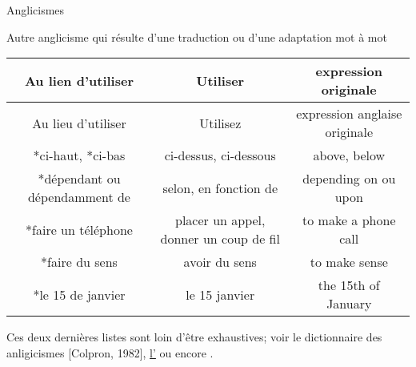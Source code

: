 \documentclass[french]{beamer}
\newcommand\red[1]{{\color{ulred}{\textbf{#1}}}}
\begin{document}
\begin{frame}{Anglicismes}

Autre anglicisme qui résulte d'une traduction ou d'une adaptation mot à mot
\begin{center}\tiny
	\begin{tabular}{ccc}
		\hline
		Au lien d'utiliser & Utiliser & expression originale \\
		\hline
		 Au lieu d'utiliser & Utilisez & expression anglaise originale \\ 
		*ci-haut, *ci-bas & ci-dessus, ci-dessous & above, below \\ 
		*dépendant ou dépendamment de & selon, en fonction de & depending on ou upon \\ 
		*faire un téléphone & placer un appel, donner un coup de fil & to make a phone call \\ 
		*faire du sens & avoir du sens & to make sense \\ 
		*le 15 de janvier & le 15 janvier & the 15th of January \\ 
		\hline
	\end{tabular} 
\end{center}

\vfill
\scriptsize{
Ces deux dernières listes sont loin d'être exhaustives; voir le dictionnaire des anligicismes [Colpron, 1982], \href{http://bdl.oqlf.gouv.qc.ca/bdl/gabarit_bdl.asp?T1=anglicisme&T3.x=0&T3.y=0}{l'\red{OQLF}} ou encore \href{http://www.alloprof.qc.ca/BV/pages/f1575.aspx}{\red{AlloProf}}.}

\end{frame}
\end{document}
